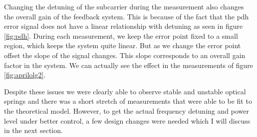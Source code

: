 Changing the detuning of the subcarrier during the measurement also changes the
overall gain of the feedback system.
This is because of the fact that the \ac{pdh} error signal does not have a
linear relationship with detuning as seen in figure \ref{fig:pdh}.
During each measurement, we keep the error point fixed to a small region,
which keeps the system quite linear.
But as we change the error point offset the slope of the signal changes.
This slope corresponds to an overall gain factor in the system.
We can actually see the effect in the measurements of figure
\ref{fig:aprilolg2}.


Despite these issues we were clearly able to observe
stable and unstable optical springs and there was a short stretch of
measurements that were able to be fit to the theoretical model.
However, to get the actual frequency detuning and power level under better
control, a few design changes were needed which I will discuss in the next
section.


